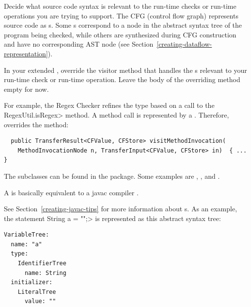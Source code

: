 Decide what source code syntax is relevant to the run-time checks or
run-time operations you are trying to support.  The CFG (control flow
graph) represents source code as s.  Some
s correspond to a node in the abstract syntax
tree of the program being checked, while others are synthesized during CFG
construction and have no corresponding AST node (see
Section~\ref{creating-dataflow-representation}).

In your extended ,
override the visitor method that handles the s
relevant to your run-time check or run-time operation.
Leave the body of the overriding method empty for now.

For example, the Regex Checker refines the type based on a call to the
\<RegexUtil.isRegex> method.  A method call is represented by a
.  Therefore,
 overrides the
 method:

\begin{smaller}
\begin{Verbatim}
  public TransferResult<CFValue, CFStore> visitMethodInvocation(
    MethodInvocationNode n, TransferInput<CFValue, CFStore> in)  { ... }
\end{Verbatim}
\end{smaller}




The  subclasses can be found in the
 package.  Some examples are
,
, and
.

A 
is basically equivalent to a javac compiler .

See Section~\ref{creating-javac-tips} for more information about s.
As an example, the statement \<String a = "";> is represented as this
abstract syntax tree:
\begin{Verbatim}
VariableTree:
  name: "a"
  type:
    IdentifierTree
      name: String
  initializer:
    LiteralTree
      value: ""
\end{Verbatim}



